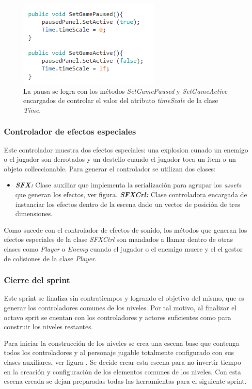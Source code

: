 \begin{figure}[h]
		\centering
		\includegraphics[height=0.2 \textheight]{03TrabajoRealizado/imagenes/Paused.png}
		\caption{La pausa se logra con los métodos \textit{SetGamePaused} y 
		\textit{SetGameActive} encargados de controlar el valor del atributo 
		\textit{timeScale} de la clase \textit{Time}.}
		\label{fig:pauseMethods}
	\end{figure} 
	
\subsubsection{Controlador de efectos especiales}
Este controlador muestra dos efectos especiales: una explosion cunado un enemigo o el jugador son derrotados y un destello cuando el jugador toca un ítem o un objeto colleccionable. Para generar el controlador se utilizan dos clases:

\begin{itemize}
	\item \textit{\textbf{SFX:}} Clase auxiliar que implementa la serialización para agrupar los \textit{assets} que generan los efectos, ver figura.
	\textit{\textbf{SFXCrl:}} Clase controladora encargada de instanciar los efectos dentro de la escena dado un vector de posición de tres dimensiones.
\end{itemize}

Como sucede con el controlador de efectos de sonido, los métodos que generan los efectos especiales de la clase \textit{SFXCtrl} son mandados a llamar dentro de otras clases como \textit{Player} o \textit{Enemy} cuando el jugador o el enemigo muere y el el gestor de colisiones de la clase \textit{Player}.

\subsubsection{Cierre del sprint}
Este sprint se finaliza sin contratiempos y logrando el objetivo del mismo, que es generar los controladores comunes de los niveles. Por tal motivo, al finalizar el octavo sprit se cuentan con los controladores y actores suficientes como para construir los niveles restantes. 
\\
\par
Para iniciar la construcción de los niveles se crea una escena base que contenga todos los controladores y al personaje jugable totalmente configurado con sus clases auxiliares, ver figura . Se decide crear esta escena para no invertir tiempo en la creación y configuración de los elementos comunes de los niveles. Con esta escena creada se dejan preparadas todas las herramientas para el siguiente sprint.

